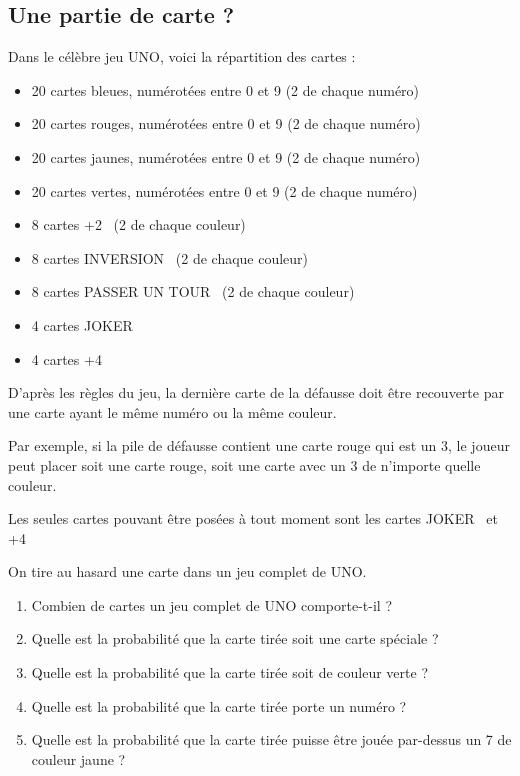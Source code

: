 \documentclass[oneside,12pt]{article}          %
\begin{document}
\subsection{Une partie de carte ?}
Dans le célèbre jeu UNO, voici la répartition des cartes :
\begin{itemize}[label=$\bullet$] 
	\item 20 cartes bleues, numérotées entre 0 et 9 (2 de chaque numéro)
	\item 20 cartes rouges, numérotées entre 0 et 9 (2 de chaque numéro)
	\item 20 cartes jaunes, numérotées entre 0 et 9 (2 de chaque numéro)
	\item 20 cartes vertes, numérotées entre 0 et 9 (2 de chaque numéro)
	\item 8 cartes \og +2 \fg \, (2 de chaque couleur)
	\item 8 cartes \og INVERSION \fg \, (2 de chaque couleur)
	\item 8 cartes \og PASSER UN TOUR \fg \, (2 de chaque couleur)
	\item 4 cartes \og JOKER \fg
	\item 4 cartes \og +4 \fg
\end{itemize}

D'après les règles du jeu, la dernière carte de la défausse doit être recouverte par une carte ayant le même numéro ou la même couleur. 

Par exemple, si la pile de défausse contient une carte rouge qui est un 3, le joueur peut placer soit une carte rouge, soit une carte avec un 3 de n'importe quelle couleur.

Les seules cartes pouvant être posées à tout moment sont les cartes \og JOKER \fg \, et \og +4 \fg

On tire au hasard une carte dans un jeu complet de UNO.
\begin{enumerate}
	\item Combien de cartes un jeu complet de UNO comporte-t-il ?
	\item Quelle est la probabilité que la carte tirée soit une carte spéciale ?
	\item Quelle est la probabilité que la carte tirée soit de couleur verte ?
	\item Quelle est la probabilité que la carte tirée porte un numéro ?
	\item Quelle est la probabilité que la carte tirée puisse être jouée par-dessus un 7 de couleur jaune ?
\end{enumerate}
\end{document}

